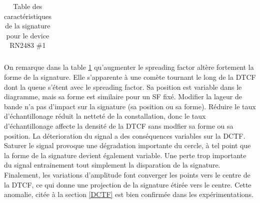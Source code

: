 \begin{table}[h]
\begin{tabular}{|c|c|c|c|c|}
\hline
\end{tabular}
\caption{Table des caractéristiques de la signature pour le device RN2483 \#1}
\label{signature1}
\end{table}

On remarque dans la table \ref{signature1} qu'augmenter le spreading factor altère fortement la forme de la signature. Elle s'apparente à une comète tournant le long de la DTCF dont la queue s'étent avec le spreading factor. Sa position est variable dans le diagramme, mais sa forme est similaire pour un SF fixé. Modifier la lageur de bande n'a pas d'impact sur la signature (sa position ou sa forme). Réduire le taux d'échantillonage réduit la netteté de la constallation, donc le taux d'échantillonage affecte la densité de la DTCF sans modfier sa forme ou sa position. La déterioration du signal a des conséquences variables sur la DCTF. Saturer le signal provoque une dégradation importante du cercle, à tel point que la forme de la signature devient également variable. Une perte trop importante du signal entrainement tout simplement la disparation de la signature. Finalement, les variations d'amplitude font converger les points vers le centre de la DTCF, ce qui donne une projection de la signature étirée vers le centre. Cette anomalie, citée à la section \ref{DCTF} est bien confirmée dans les expérimentations.

